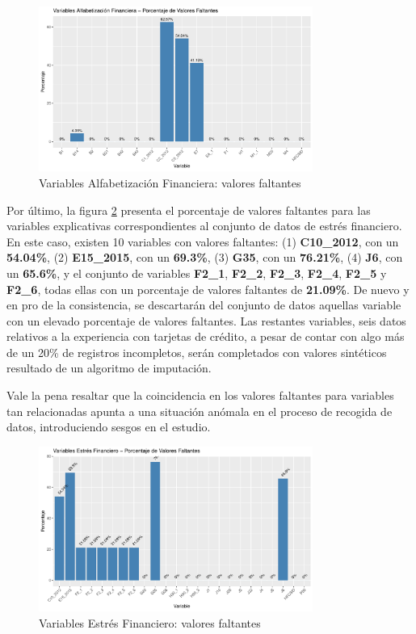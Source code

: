 \documentclass[a4paper, 11pt]{article}
\begin{document}
\begin{figure}[ht]
    \centering
    \includegraphics[width=0.8\textwidth]{images/Capabilities_Features__Missing_Values.pdf} 
    \caption{Variables Alfabetización Financiera: valores faltantes}
    \label{fig:capabilities_features_missing_values}
\end{figure}

Por último, la figura \ref{fig:stress_features_missing_values} presenta el porcentaje de valores
faltantes para las variables explicativas correspondientes al conjunto de datos de estrés
financiero. En este caso, existen 10 variables con valores faltantes: (1) \textbf{C10\_2012}, con 
un \textbf{54.04\%}, (2) \textbf{E15\_2015}, con un \textbf{69.3\%}, (3) \textbf{G35}, con un 
\textbf{76.21\%}, (4) \textbf{J6}, con un \textbf{65.6\%}, y el conjunto de variables
\textbf{F2\_1}, \textbf{F2\_2}, \textbf{F2\_3}, \textbf{F2\_4}, \textbf{F2\_5} y \textbf{F2\_6}, 
todas ellas con un porcentaje de valores faltantes de \textbf{21.09\%}. De nuevo y en pro de la 
consistencia, se descartarán del conjunto de datos aquellas variable con un elevado porcentaje
de valores faltantes. Las restantes variables, seis datos relativos a la experiencia con tarjetas 
de crédito, a pesar de contar con algo más de un 20\% de registros incompletos, serán completados
con valores sintéticos resultado de un algoritmo de imputación. 

Vale la pena resaltar que la coincidencia en los valores faltantes para variables tan relacionadas
apunta a una situación anómala en el proceso de recogida de datos, introduciendo sesgos en el estudio. 

\begin{figure}[ht]
    \centering
    \includegraphics[width=0.8\textwidth]{images/Stress_Features__Missing_Values.pdf} 
    \caption{Variables Estrés Financiero: valores faltantes}
    \label{fig:stress_features_missing_values}
\end{figure}
\end{document}
